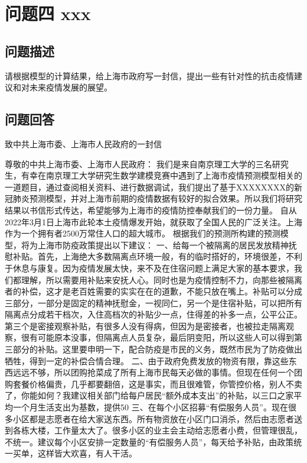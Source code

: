 \documentclass[bwprint]{gmcmthesis}
\numberwithin{figure}{section}
\begin{document}
\section{问题四 xxx}
\subsection{问题描述}
请根据模型的计算结果，给上海市政府写一封信，提出一些有针对性的抗击疫情建议和对未来疫情发展的展望。
\subsection{问题回答}
致中共上海市委、上海市人民政府的一封信

尊敬的中共上海市委、上海市人民政府：
我们是来自南京理工大学的三名研究生，有幸在南京理工大学研究生数学建模竞赛中遇到了上海市疫情预测模型相关的一道题目，通过查阅相关资料、进行数据调试，我们提出了基于XXXXXXXX的新冠肺炎预测模型，并对上海市前期的疫情数据有较好的拟合效果。所以我们将研究结果以书信形式传达，希望能够为上海市的疫情防控奉献我们的一份力量。
自从2022年3月1日上海市此轮本土疫情爆发开始，就获取了全国人民的广泛关注。上海作为一个拥有者2500万常住人口的超大城市。
根据我们的预测所构建的预测模型，将为上海市防疫政策提出以下建议：
一、给每一个被隔离的居民发放精神抚慰补贴。首先，上海绝大多数隔离点环境一般，有的临时搭好的，环境很差，不利于休息与康复。因为疫情发展太快，来不及在住宿问题上满足大家的基本要求，我们都理解，所以需要用补贴来安抚人心。同时也是为疫情控制不力，向那些被隔离者的补偿，这才是老百姓需要的实实在在的道歉，不能只放在嘴上。补贴可以分成三部分，一部分是固定的精神抚慰金，一视同仁，另一个是住宿补贴，可以把所有隔离点分成若干档次，入住高档次的补贴少一点，住得差的补多一点，公平公正。第三个是密接观察补贴，有很多人没有得病，但因为是密接者，也被拉走隔离观察，很有可能原本没事，但隔离点人员复杂，最后阴变阳，所以这些人可以得到第三部分的补贴。这里要申明一下，配合防疫是市民的义务，既然市民为了防疫做出牺牲，得到一定的补偿合情合理。
二、由于政府免费发放的物资有限，靠这些东西远远不够，所以团购抢菜成了所有上海市民每天必做的事情。但现在任何一个团购套餐价格偏贵，几乎都要翻倍，这是事实，而且很难管，你管控价格，别人不卖了，你能如何？我建议相关部门给每户居民“额外成本支出”的补贴，以三口之家平均一个月生活支出为基数，提供50%
三、在每个小区招募“有偿服务人员”。现在很多小区都是志愿者在给大家送东西。所有物资放在小区门口消杀，然后由志愿者送到各栋大楼，工作量太大了。很多小区的业主会主动给志愿者小费，但管理很乱，不统一。建议每个小区安排一定数量的“有偿服务人员”，每天给予补贴，由政策统一买单，这样皆大欢喜，有人干活。
\end{document}

